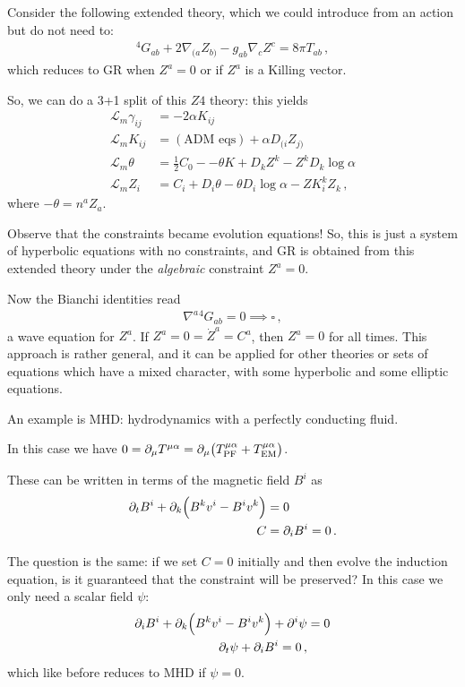 \documentclass[main.tex]{subfiles}
\begin{document}
Consider the following extended theory, which we could introduce from an action but do not need to: 
%
\begin{align}
^4G_{ab} + 2 \nabla_{(a} Z_{b)} - g_{ab} \nabla_{c} Z^{c} = 8 \pi T_{ab} 
\,,
\end{align}
%
which reduces to GR when \(Z^a = 0\) or if \(Z^{a}\) is a Killing vector. 

So, we can do a 3+1 split of this \(Z4\) theory: this yields 
%
\begin{align}
\mathscr{L}_m \gamma_{ij} &= - 2 \alpha K_{ij}  \\
\mathscr{L}_m K_{ij} &= (\text{ADM eqs}) + \alpha D_{(i} Z_{j)}  \\
\mathscr{L}_m \theta &= \frac{1}{2} C_0 -- \theta K + D_k Z^k - Z^k D_k \log \alpha   \\
\mathscr{L}_m Z_i &= C_i + D_i \theta - \theta D_i \log \alpha - Z K^{k}_i Z_k 
\,,
\end{align}
%
where \(- \theta = n^a Z_a\). 

Observe that the constraints became evolution equations! 
So, this is just a system of hyperbolic equations with no constraints, and GR is obtained from this extended theory under the \emph{algebraic} constraint \(Z^a = 0\). 

Now the Bianchi identities read 
%
\begin{align}
\nabla^{a} {}^4 G_{ab} = 0 \implies \square 
\,,
\end{align}
%
a wave equation for \(Z^{a}\). 
If \(Z^{a} = 0 = \dot{Z}^{a} = C^{a}\), then \(Z^{a} = 0\) for all times. 
This approach is rather general, and it can be applied for other theories or sets of equations which have a mixed character, with some hyperbolic and some elliptic equations. 

An example is MHD: hydrodynamics with a perfectly conducting fluid. 

In this case we have \(0= \partial_{\mu } T^{\mu \alpha } = \partial_{\mu } \qty(T^{\mu \alpha }_{\text{PF}} + T^{\mu \alpha }_{\text{EM}})\). 

These can be written in terms of the magnetic field \(B^{i}\) as 
%
\begin{align}
\partial_{t} B^{i} + \partial_{k} \qty(B^{k} v^{i} - B^{i} v^{k}) &= 0  \\
C &= \partial_{i} B^{i} = 0
\,.
\end{align}

The question is the same: if we set \(C=0\) initially and then evolve the induction equation, is it guaranteed that the constraint will be preserved? 
In this case we only need a scalar field \(\psi \): 
%
\begin{align}
\partial_{i} B^{i} + \partial_{k} \qty(B^{k}v^{i} - B^{i} v^{k}) + \partial^{i} \psi &= 0  \\
\partial_{t} \psi + \partial_{i} B^{i} = 0 
\,,
\end{align}
%
which like before reduces to MHD if \(\psi = 0\). 
\end{document}
